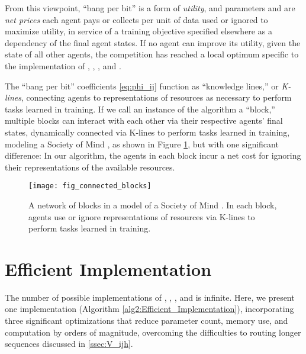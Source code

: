 \documentclass[11pt,a4paper]{article}
\begin{document}
From this viewpoint, ``bang per bit'' is a form of {\em utility}, and parameters  and  are {\em net prices} each agent pays or collects per unit of data used or ignored to maximize utility, in service of a training objective specified elsewhere as a dependency of the final agent states. If no agent can improve its utility, given the state of all other agents, the competition has reached a local optimum specific to the implementation of , , , and .

The ``bang per bit'' coefficients  \eqref{eq:phi_ij} function as ``knowledge lines,'' or {\em K-lines}, connecting agents to representations of resources as necessary to perform tasks learned in training. If we call an instance of the algorithm a ``block,'' multiple blocks can interact with each other via their respective agents' final states, dynamically connected via K-lines to perform tasks learned in training, modeling a Society of Mind \cite{10.5555/22939}, as shown in Figure \ref{fig:connected_blocks}, but with one significant difference: In our algorithm, the agents in each block incur a net cost for ignoring their representations of the available resources.

\begin{figure}[t]
	\vskip 0.1in
	\begin{center}
		\centerline{\texttt{[image: fig\_connected\_blocks]}}
		\caption{A network of blocks in a model of a Society of Mind \cite{10.5555/22939}. In each block, agents use or ignore representations of resources via K-lines to perform tasks learned in training.}
		\label{fig:connected_blocks}
	\end{center}
	\vskip -0.2in
\end{figure} 


\section{Efficient Implementation}\label{sec:implementation}

The number of possible implementations of , , , and  is infinite. Here, we present one implementation (Algorithm \ref{alg2:Efficient_Implementation}), incorporating three significant optimizations that reduce parameter count, memory use, and computation by orders of magnitude, overcoming the difficulties to routing longer sequences discussed in \ref{ssec:V_ijh}.
\end{document}
